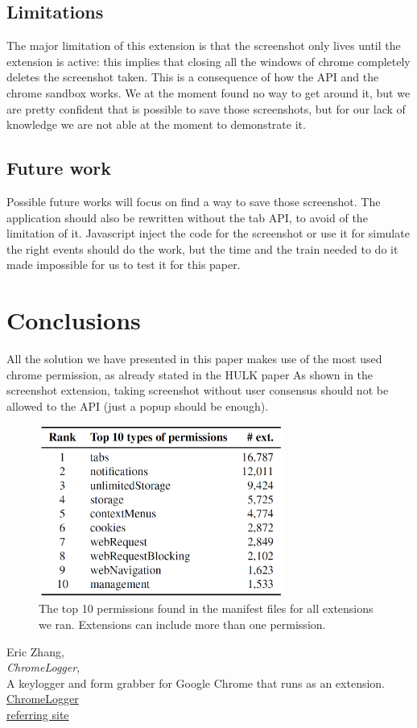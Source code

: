 \documentclass[12pt]{article}
\begin{document}
\begin{multicols}{2}
\subsection*{Limitations}
The major limitation of this extension is that the screenshot only lives until the extension is active: this implies that closing all the windows of chrome completely deletes the screenshot taken.
This is a consequence of how the API and the chrome sandbox works. We at the moment found no way to get around it, but we are pretty confident that is possible to save those screenshots, but for our lack of knowledge we are not able at the moment to demonstrate it.
\subsection*{Future work}
Possible future works will focus on find a way to save those screenshot.
The application should also be rewritten without the tab API, to avoid of the limitation of it.
Javascript inject the code for the screenshot or use it for simulate the right events should do the work, but the time and the train needed to do it made impossible for us to test it for this paper.
\section*{Conclusions}
All the solution we have presented in this paper makes use of the most used chrome permission, as already stated in the HULK paper\cite{HULK}
As shown in the screenshot extension, taking screenshot without user consensus should not be allowed to the API (just a popup should be enough).
\begin{figure}[H]
	\begin{center}
		\includegraphics[width=8cm]{permission.png}
		\caption{The top 10 permissions found in the manifest
			files for all extensions we ran. Extensions can include			
			more than one permission.}
	\end{center}
\end{figure}
\begin{thebibliography}{2}
	Eric Zhang,\\
	\emph{ChromeLogger},\\
A keylogger and form grabber for Google Chrome that runs as an extension.\\
\href{https://github.com/Xeroday/ChromeLogger}{ChromeLogger}\\
\href{https://www.ericzhang.me/projects/chromelogger/}{referring site}


\end{thebibliography}
\end{multicols}
\end{document}
